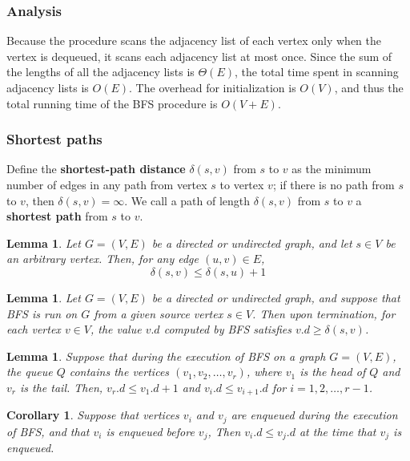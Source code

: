 \documentclass[12pt]{article}
\newtheorem{lemma}[theorem]{Lemma}
\newtheorem{corollary}[theorem]{Corollary}
\begin{document}
\subsubsection*{Analysis}

Because the procedure scans the adjacency list of each vertex only when the vertex is dequeued, it scans each adjacency list at most once. Since the sum of the lengths of all the adjacency lists is $\Theta(E)$, the total time spent in scanning adjacency lists is $O(E)$. The overhead for initialization is $O(V)$, and thus the total running time of the BFS procedure is $O(V+E)$.

\subsubsection*{Shortest paths}

Define the \textbf{shortest-path distance} $\delta(s,v)$ from $s$ to $v$ as the minimum number of edges in any path from vertex $s$ to vertex $v$; if there is no path from $s$ to $v$, then $\delta (s,v) = \infty$. We call a path of length $\delta(s,v)$ from $s$ to $v$ a \textbf{shortest path} from $s$ to $v$.

\begin{lemma}
  Let $G = (V,E)$ be a directed or undirected graph, and let $s \in V$ be an arbitrary vertex. Then, for any edge $(u,v) \in E$,
  \begin{equation*}
    \delta(s,v) \le \delta(s,u) + 1
  \end{equation*}
\end{lemma}

\begin{lemma}
  Let $G = (V,E)$ be a directed or undirected graph, and suppose that BFS is run on $G$ from a given source vertex $s \in V$. Then upon termination, for each vertex $v \in V$, the value $v.d$ computed by BFS satisfies $v.d \ge \delta(s,v)$.
\end{lemma}

\begin{lemma}
  Suppose that during the execution of BFS on a graph $G = (V,E)$, the queue $Q$ contains the vertices $(v_1, v_2, \dots, v_r)$, where $v_1$ is the head of $Q$ and $v_r$ is the tail. Then, $v_r.d \le v_1.d + 1$ and $v_i.d \le v_{i+1}.d$ for $i = 1, 2, \dots, r-1$.
\end{lemma}

\begin{corollary}
  Suppose that vertices $v_i$ and $v_j$ are enqueued during the execution of BFS, and that $v_i$ is enqueued before $v_j$, Then $v_i.d \le v_j.d$ at the time that $v_j$ is enqueued.
\end{corollary}
\end{document}
